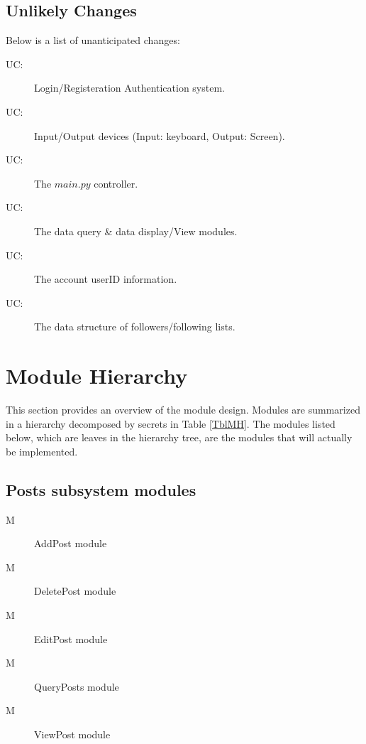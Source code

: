 \documentclass[12pt, titlepage]{article}
\newcounter{ucnum}
\newcommand{\uctheucnum}{UC\theucnum}
\newcounter{mnum}
\newcommand{\mthemnum}{M\themnum}
\begin{document}
\subsection{Unlikely Changes} \label{SecUchange}
Below is a list of unanticipated changes:

\begin{description}
\item[ \uctheucnum \label{uc1}:] Login/Registeration Authentication system.
\item[ \uctheucnum \label{uc2}:] Input/Output devices (Input: keyboard, Output: Screen).
\item[ \uctheucnum \label{uc3}:] The $main.py$ controller.
\item[ \uctheucnum \label{uc4}:] The data query \& data display/View modules.
\item[ \uctheucnum \label{uc5}:] The account userID information.
\item[ \uctheucnum \label{uc6}:] The data structure of followers/following lists.
\end{description}

\newpage
\section{Module Hierarchy} \label{SecMH}

This section provides an overview of the module design. Modules are summarized
in a hierarchy decomposed by secrets in Table \ref{TblMH}. The modules listed
below, which are leaves in the hierarchy tree, are the modules that will
actually be implemented.

\subsection{Posts subsystem modules}
\begin{description}
\item[ \mthemnum \label{M1}] AddPost module
\item[ \mthemnum \label{M2}] DeletePost module
\item[ \mthemnum \label{M3}] EditPost module
\item[ \mthemnum \label{M4}] QueryPosts module
\item[ \mthemnum \label{M5}] ViewPost module
\end{description}
\end{document}
